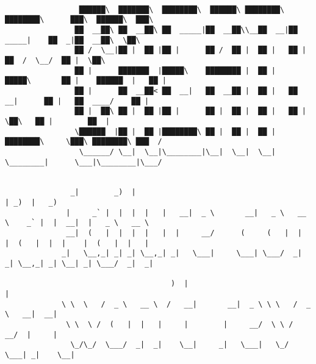 \documentclass[varwidth=\maxdimen,margin=0.5cm,multi={verbatim}]{standalone}
\begin{document}
\begin{verbatim}

                 ██████\  ███████\  ████████\  ██████\ ████████\ ████████\      ███\  ██████\  ███\
                ██  __██\ ██  __██\ ██  _____|██  __██\\__██  __|██  _____|    ██  _|██  __██\  \██\
                ██ /  \__|██ |  ██ |██ |      ██ /  ██ |  ██ |   ██ |         ██  /  \__/  ██ |  \██\
                ██ |      ███████  |█████\    ████████ |  ██ |   █████\       ██ |    ██████  |   ██ |
                ██ |      ██  __██< ██  __|   ██  __██ |  ██ |   ██  __|      ██ |   ██  ____/    ██ |
                ██ |  ██\ ██ |  ██ |██ |      ██ |  ██ |  ██ |   ██ |         \██\   ██ |        ██  |
                \██████  |██ |  ██ |████████\ ██ |  ██ |  ██ |   ████████\     \███\ ████████\ ███  /
                 \______/ \__|  \__|\________|\__|  \__|  \__|   \________|      \___|\________|\___/


               _|        _)  |                                                | _)  |   _)
              |     _` |  |  |  |   |   __|  _ \       __|   _ \   __ \    _` |  |  __|  |   _ \   __ \
              __|  (   |  |  |  |   |  |     __/      (     (   |  |   |  (   |  |  |    |  (   |  |   |
             _|   \__,_| _| _| \__,_| _|   \___|     \___| \___/  _|  _| \__,_| _| \__| _| \___/  _|  _|

                                      )  |                                      |
             \ \  \   /  _ \   __ \  /   __|       __|  _ \ \ \   /  _ \   __|  __|
              \ \  \ /  (   |  |   |     |        |     __/  \ \ /   __/  |     |
               \_/\_/  \___/  _|  _|    \__|     _|   \___|   \_/  \___| _|    \__|



\end{verbatim}
\end{document}
